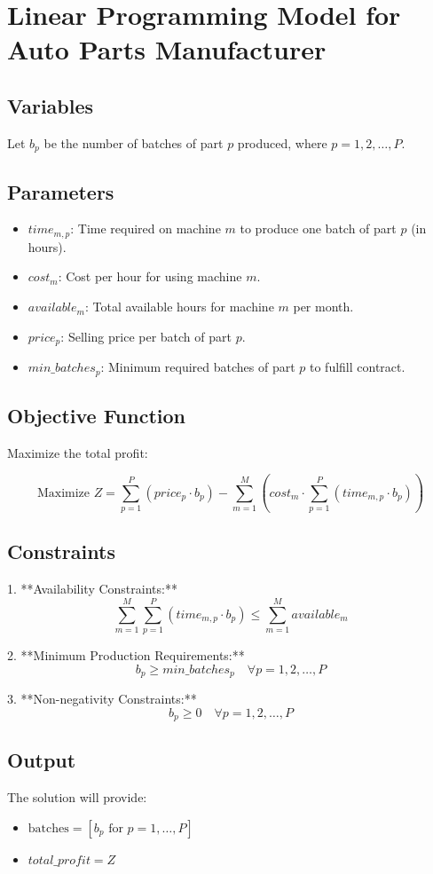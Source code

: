 \documentclass{article}
\begin{document}
\section*{Linear Programming Model for Auto Parts Manufacturer}

\subsection*{Variables}
Let \( b_p \) be the number of batches of part \( p \) produced, where \( p = 1, 2, \ldots, P \).

\subsection*{Parameters}
\begin{itemize}
    \item \( time_{m,p} \): Time required on machine \( m \) to produce one batch of part \( p \) (in hours).
    \item \( cost_m \): Cost per hour for using machine \( m \).
    \item \( available_m \): Total available hours for machine \( m \) per month.
    \item \( price_p \): Selling price per batch of part \( p \).
    \item \( min\_batches_p \): Minimum required batches of part \( p \) to fulfill contract.
\end{itemize}

\subsection*{Objective Function}
Maximize the total profit:

\[
\text{Maximize } Z = \sum_{p=1}^{P} (price_p \cdot b_p) - \sum_{m=1}^{M} \left( cost_m \cdot \sum_{p=1}^{P} (time_{m,p} \cdot b_p) \right)
\]

\subsection*{Constraints}

1. **Availability Constraints:**
\[
\sum_{m=1}^{M} \sum_{p=1}^{P} (time_{m,p} \cdot b_p) \leq \sum_{m=1}^{M} available_m
\]

2. **Minimum Production Requirements:**
\[
b_p \geq min\_batches_p \quad \forall p = 1, 2, \ldots, P
\]

3. **Non-negativity Constraints:**
\[
b_p \geq 0 \quad \forall p = 1, 2, \ldots, P
\]

\subsection*{Output}
The solution will provide:
\begin{itemize}
    \item \( \text{batches} = [b_p \text{ for } p = 1, \ldots, P] \)
    \item \( total\_profit = Z \)
\end{itemize}
\end{document}
